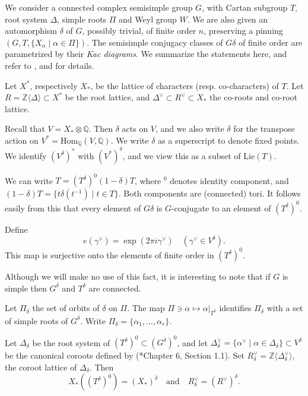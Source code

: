\documentclass[10pt,leqno]{article}
\newcommand{\Hom}{\text{Hom}}
\newcommand{\Lie}{\text{Lie}}
\newcommand{\Z}{\mathbb Z}
\newcommand{\Q}{\mathbb Q}
\newcommand{\ch}[1]{#1^\vee}
\newcommand\inv{^{-1}}
\begin{document}
We consider a connected complex semisimple group $G$, with Cartan subgroup $T$, root system $\Delta$,
simple roots $\Pi$ and Weyl group $W$. We are also given
an  automorphism $\delta$ of $G$, possibly trivial, of finite order $n$, preserving a pinning $(G,T,\{X_\alpha\mid \alpha\in\Pi\})$.
The semisimple
conjugacy classes of $G\delta$ of finite order are parametrized by their
{\it Kac diagrams}. We summarize the statements here, and refer to
\cite{ov}, \cite{kac_book} and \cite{reeder_torsion} for details.


Let $X^*$, respectively $X_*$, be the lattice of characters (resp. co-characters) of $T$.
Let $R=\Z\langle\Delta\rangle\subset X^*$ be
the root lattice, and $\ch\Delta\subset \ch R\subset X_*$ the co-roots and co-root lattice.

Recall that $V=X_*\otimes\Q$. Then $\delta$ acts on $V$, and we also write
$\delta$ for the transpose action on $V^*=\Hom_\Q(V,\Q)$.
We write $\delta$ as a superscript to denote fixed points.
We identify $(V^\delta)^*$ with $(V^*)^\delta$, and we view this as a subset of $\Lie(T)$.

We can write $T=(T^\delta)^0(1-\delta)T$, where $\phantom{}^0$ denotes identity component,
and $(1-\delta)T=\{t\delta(t\inv)\mid t\in T\}$. Both components are (connected) tori.
It follows easily from this that every element of $G\delta$ is $G$-conjugate
to an element of $(T^\delta)^0$.

Define
\begin{equation}
\label{e:e}
e(\ch\gamma)=\exp(2\pi i\ch\gamma) \quad(\ch\gamma\in V^\delta).
\end{equation}
This map is surjective  onto the elements of finite order in $(T^\delta)^0$.

Although we will make no use of this fact, it is interesting to note that if $G$ is simple then
$G^\delta$  and $T^\delta$ are connected.

Let $\Pi_\delta$ the set of orbits of $\delta$ on $\Pi$. The map
$\Pi\ni\alpha\mapsto \alpha|_{T^{\delta}}$ identifies $\Pi_\delta$ with 
a set of simple roots of 
$G^{\delta}$. Write $\Pi_\delta=\{\alpha_1,\dots,\alpha_r\}$.

Let $\Delta_\delta$ be the root system of
$(T^{\delta})^0\subset (G^{\delta})^0$, and let
$\ch\Delta_\delta=\{\ch\alpha\mid \alpha\in\Delta_\delta\}\subset
V^\delta$ be the canonical coroots defined by
(\cite{bourbaki_4-6}*{Chapter 6, Section 1.1}).
Set $\ch R_\delta=\Z\langle\ch\Delta_\delta\rangle$, the coroot lattice of $\Delta_\delta$.
Then
$$
X_*((T^{\delta})^0)=(X_*)^\delta\quad\text{and}\quad \ch R_\delta=(\ch R)^\delta.
$$
\end{document}

